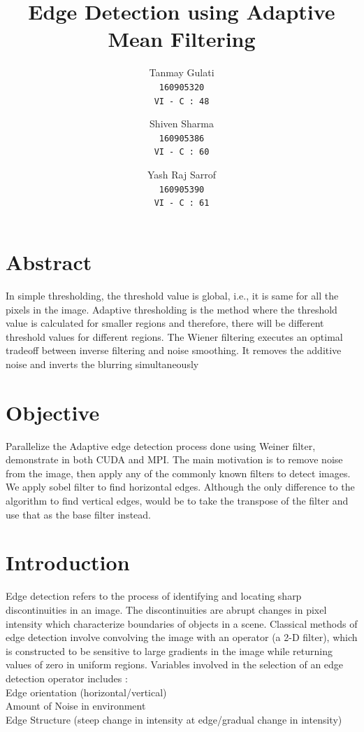 \documentclass[]{article}
\title{\vspace{-25mm} Edge Detection using Adaptive Mean Filtering}
\date{}
\author{
	Tanmay Gulati\\
	\texttt{160905320}\\
	\texttt{VI - C : 48}\\
	\and
	Shiven Sharma\\
	\texttt{160905386}\\
	\texttt{VI - C : 60}\\
	\and
	Yash Raj Sarrof\\
	\texttt{160905390}\\
	\texttt{VI - C : 61}
}
\begin{document}
\pagestyle{empty}
\maketitle
\section*{Abstract} 
\hspace{6mm} In simple thresholding, the threshold value is global, i.e., it is same for all the pixels in the image.
Adaptive thresholding is the method where the threshold value is calculated for smaller regions and
therefore, there will be different threshold values for different regions. The Wiener filtering executes an
optimal tradeoff between inverse filtering and noise smoothing. It removes the additive noise and inverts
the blurring simultaneously

\section*{Objective} 
\hspace{6mm} Parallelize the Adaptive edge detection process done using Weiner filter, demonstrate in both CUDA and MPI. The main motivation is to remove noise from the image, then apply any of the commonly known filters to detect images. We apply sobel filter to find horizontal edges. Although the only difference to the algorithm to find vertical edges, would be to take the transpose of the filter and use that as the base filter instead. 

\section*{Introduction}
\hspace{6mm} Edge detection refers to the process of identifying and locating sharp discontinuities in an image. The discontinuities are abrupt changes in pixel intensity which characterize boundaries of objects in a scene. Classical
methods of edge detection involve convolving the image with an operator (a 2-D filter), which is constructed
to be sensitive to large gradients in the image while returning values of zero in uniform regions.
Variables involved in the selection of an edge detection operator includes : \\
\textbullet \hspace{4mm} Edge orientation (horizontal/vertical) \\
\textbullet  \hspace{4mm} Amount of Noise in environment\\
\textbullet \hspace{4mm}  Edge Structure (steep change in intensity at edge/gradual change in intensity)\\
\end{document}
